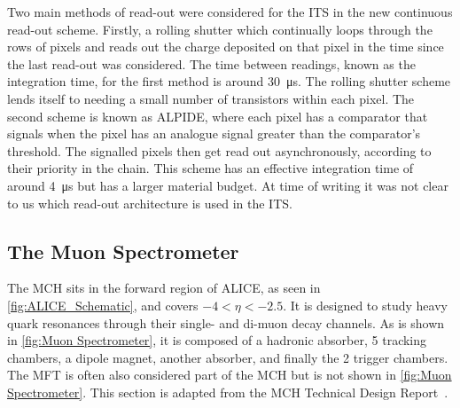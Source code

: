 Two main methods of read-out were considered for the ITS in the new continuous read-out scheme. Firstly, a rolling shutter which continually loops through the rows of pixels and reads out the charge deposited on that pixel in the time since the last read-out was considered. The time between readings, known as the integration time, for the first method is around \SI{30}{\micro\second}. The rolling shutter scheme lends itself to needing a small number of transistors within each pixel. The second scheme is known as ALPIDE, where each pixel has a comparator that signals when the pixel has an analogue signal greater than the comparator's threshold. The signalled pixels then get read out asynchronously, according to their priority in the chain. This scheme has an effective integration time of around \SI{4}{\micro\second} but has a larger material budget. At time of writing it was not clear to us which read-out architecture is used in the ITS.


\subsection{The Muon Spectrometer}
The MCH sits in the forward region of ALICE, as seen in \cref{fig:ALICE_Schematic}, and covers $-4<\eta<-2.5$. It is designed to study heavy quark resonances through their single- and di-muon decay channels. As is shown in \cref{fig:Muon Spectrometer}, it is composed of a hadronic absorber, 5 tracking chambers, a dipole magnet, another absorber, and finally the 2 trigger chambers. The MFT is often also considered part of the MCH but is not shown in \cref{fig:Muon Spectrometer}. This section is adapted from the MCH Technical Design Report~\cite{MCH_TDR}.

